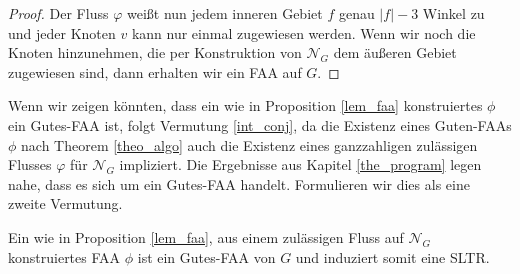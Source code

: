 \begin{proof}
Der Fluss $\varphi$ weißt nun jedem inneren Gebiet $f$ genau $|f|-3$ Winkel zu und jeder Knoten $v$ kann nur einmal zugewiesen werden. Wenn wir noch die Knoten hinzunehmen, die per Konstruktion von $\mathcal{N}_G$ dem äußeren Gebiet zugewiesen sind, dann erhalten wir ein FAA auf $G$.
\end{proof}

Wenn wir zeigen könnten, dass ein wie in Proposition \ref{lem_faa} konstruiertes $\phi$ ein Gutes-FAA ist, folgt Vermutung \ref{int_conj}, da die Existenz eines Guten-FAAs $\phi$ nach Theorem \ref{theo_algo} auch die Existenz eines ganzzahligen zulässigen Flusses $\varphi$ für $\mathcal{N}_G$ impliziert. Die Ergebnisse aus Kapitel \ref{the_program} legen nahe, dass es sich um ein Gutes-FAA handelt. Formulieren wir dies als eine zweite Vermutung.

\begin{conjecture}\label{faa_conj}
Ein wie in Proposition \ref{lem_faa}, aus einem zulässigen Fluss auf $\mathcal{N}_G$ konstruiertes FAA $\phi$ ist ein Gutes-FAA von $G$ und induziert somit eine SLTR.
\end{conjecture}

